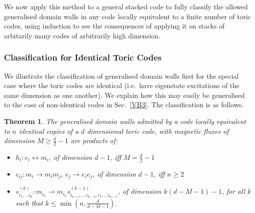 \documentclass[pra,twocolumn,a4paper,nofootinbib]{revtex4-1}
\newtheorem{theorem}{Theorem}
\begin{document}
We now apply this method to a general stacked code to fully classify the allowed generalised domain walls in any code locally equivalent to a finite number of toric codes, using induction to see the consequences of applying it on stacks of arbitarily many codes of arbitrarily high dimension.

\subsubsection{Classification for Identical Toric Codes}
We illustrate the classification of generalised domain walls first for the special case where the toric codes are identical (i.e.~have eigenstate excitations of the same dimension as one another). We explain how this may easily be generalised to the case of non-identical codes in Sec.~\ref{VB3}. The classification is as follows.

\begin{theorem}\label{Th2}
The generalised domain walls admitted by a code locally equivalent to $n$ identical copies of a $d$ dimensional toric code, with magnetic fluxes of dimension $M \geq \frac{d}{2}-1$ are products of:
\begin{itemize}
\item $h_i: e_i \leftrightarrow m_i$, of dimension $d-1$, iff $M=\frac{d}{2}-1$
\item $c_{ij}: m_i \to m_im_j, \, e_j \to e_i e_j$, of dimension $d-1$, iff $n \geq 2$
\item $s^{(k)}_{i_1, \ldots i_k}: m_{i_a} \to m_{i_a}s^{(k-1)}_{i_{a+1}, \ldots i_{k-1},i_1,\ldots i_{a-1}}$, of dimension $k(d-M-1)-1$, for all $k$ such that $k \leq \min\left(n,\frac{d}{d-M-1}\right)$.
\end{itemize}
\end{theorem}
\end{document}
